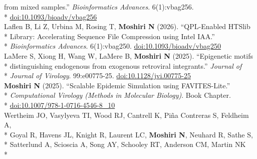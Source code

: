\documentclass[margin,line]{res}
\begin{document}
\begin{resume}
\hspace*{9.5mm} from mixed samples.'' \textit{Bioinformatics Advances}. 6(1):vbag256.\\*\vspace{2mm}
\hspace*{8mm} \href{https://doi.org/10.1093/bioadv/vbag256}{doi:10.1093/bioadv/vbag256}\\
\hspace*{4mm} Laflen B, Li Z, Urbina M, Rosing T, \textbf{Moshiri N} (2026). ``QPL-Enabled HTSlib\\*
\hspace*{9.5mm} Library: Accelerating Sequence File Compression using Intel IAA.''\\*\vspace{2mm}
\hspace*{8mm} \textit{Bioinformatics Advances}. 6(1):vbag250. \href{https://doi.org/10.1093/bioadv/vbag250}{doi:10.1093/bioadv/vbag250}\\
\hspace*{4mm} LaMere S, Xiong H, Wang W, LaMere B, \textbf{Moshiri N} (2025). ``Epigenetic motifs\\*
\hspace*{9.5mm} distinguishing endogenous from exogenous retroviral integrants.'' \textit{Journal of}\\*\vspace{2mm}
\hspace*{8mm} \textit{Journal of Virology}. 99:e00775-25. \href{https://doi.org/10.1128/jvi.00775-25}{doi:10.1128/jvi.00775-25}\\
\hspace*{4mm} \textbf{Moshiri N} (2025). ``Scalable Epidemic Simulation using FAVITES-Lite.''\\*
\hspace*{9.5mm} \textit{Computational Virology (Methods in Molecular Biology)}. Book Chapter.\\*\vspace{2mm}
\hspace*{8mm} \href{https://doi.org/10.1007/978-1-0716-4546-8_10}{doi:10.1007/978-1-0716-4546-8\_10}\\
\hspace*{4mm} Wertheim JO, Vasylyeva TI, Wood RJ, Cantrell K, Pi{\~n}a Contreras S, Feldheim A,\\*
\hspace*{9.5mm} Goyal R, Havens JL, Knight R, Laurent LC, \textbf{Moshiri N}, Neuhard R, Sathe S,\\*
\hspace*{9.5mm} Satterlund A, Scioscia A, Song AY, Schooley RT, Anderson CM, Martin NK\\*

\end{resume}
\end{document}
